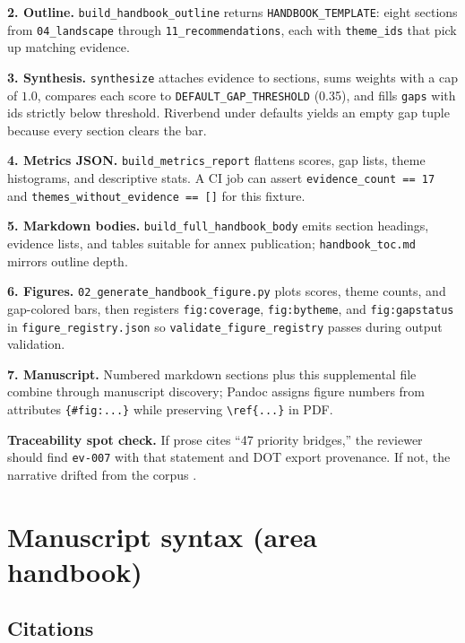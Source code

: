 \documentclass[
]{article}
\begin{document}
\textbf{2. Outline.} \texttt{build\_handbook\_outline} returns
\texttt{HANDBOOK\_TEMPLATE}: eight sections from \texttt{04\_landscape}
through \texttt{11\_recommendations}, each with \texttt{theme\_ids} that
pick up matching evidence.

\textbf{3. Synthesis.} \texttt{synthesize} attaches evidence to
sections, sums weights with a cap of \(1.0\), compares each score to
\texttt{DEFAULT\_GAP\_THRESHOLD} (0.35), and fills \texttt{gaps} with
ids strictly below threshold. Riverbend under defaults yields an empty
gap tuple because every section clears the bar.

\textbf{4. Metrics JSON.} \texttt{build\_metrics\_report} flattens
scores, gap lists, theme histograms, and descriptive stats. A CI job can
assert \texttt{evidence\_count\ ==\ 17} and
\texttt{themes\_without\_evidence\ ==\ {[}{]}} for this fixture.

\textbf{5. Markdown bodies.} \texttt{build\_full\_handbook\_body} emits
section headings, evidence lists, and tables suitable for annex
publication; \texttt{handbook\_toc.md} mirrors outline depth.

\textbf{6. Figures.} \texttt{02\_generate\_handbook\_figure.py} plots
scores, theme counts, and gap-colored bars, then registers
\texttt{fig:coverage}, \texttt{fig:bytheme}, and \texttt{fig:gapstatus}
in \texttt{figure\_registry.json} so \texttt{validate\_figure\_registry}
passes during output validation.

\textbf{7. Manuscript.} Numbered markdown sections plus this
supplemental file combine through manuscript discovery; Pandoc assigns
figure numbers from attributes \texttt{\{\#fig:...\}} while preserving
\texttt{\textbackslash{}ref\{...\}} in PDF.

\textbf{Traceability spot check.} If prose cites ``47 priority
bridges,'' the reviewer should find \texttt{ev-007} with that statement
and DOT export provenance. If not, the narrative drifted from the corpus
\citep{gray2005}.

\newpage

\section{Manuscript syntax (area
handbook)}\label{manuscript-syntax-area-handbook}

\subsection{Citations}\label{citations}
\end{document}
